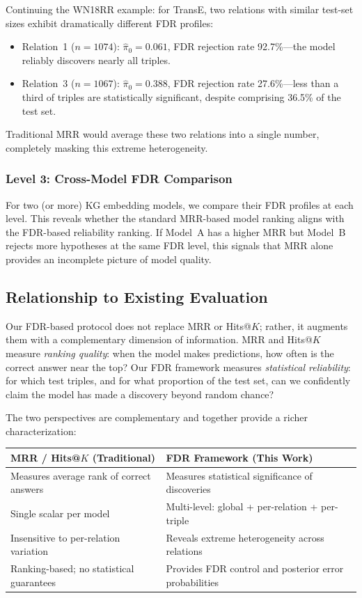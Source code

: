Continuing the WN18RR example: for TransE, two relations with similar test-set sizes exhibit dramatically different FDR profiles:
\begin{itemize}
    \item Relation~1 ($n=1074$): $\hat{\pi}_0 = 0.061$, FDR rejection rate 92.7\%---the model reliably discovers nearly all triples.
    \item Relation~3 ($n=1067$): $\hat{\pi}_0 = 0.388$, FDR rejection rate 27.6\%---less than a third of triples are statistically significant, despite comprising 36.5\% of the test set.
\end{itemize}
Traditional MRR would average these two relations into a single number, completely masking this extreme heterogeneity.

\subsubsection{Level 3: Cross-Model FDR Comparison}
For two (or more) KG embedding models, we compare their FDR profiles at each level.
This reveals whether the standard MRR-based model ranking aligns with the FDR-based reliability ranking.
If Model~A has a higher MRR but Model~B rejects more hypotheses at the same FDR level, this signals that MRR alone provides an incomplete picture of model quality.

\subsection{Relationship to Existing Evaluation}
\label{subsec:relationship}

Our FDR-based protocol does not replace MRR or Hits@$K$; rather, it augments them with a complementary dimension of information.
MRR and Hits@$K$ measure \emph{ranking quality}: when the model makes predictions, how often is the correct answer near the top?
Our FDR framework measures \emph{statistical reliability}: for which test triples, and for what proportion of the test set, can we confidently claim the model has made a discovery beyond random chance?

The two perspectives are complementary and together provide a richer characterization:

\begin{center}
\begin{tabular}{p{} p{}}
\toprule
\textbf{MRR / Hits@$K$ (Traditional)} & \textbf{FDR Framework (This Work)} \\
\midrule
Measures average rank of correct answers & Measures statistical significance of discoveries \\
Single scalar per model & Multi-level: global + per-relation + per-triple \\
Insensitive to per-relation variation & Reveals extreme heterogeneity across relations \\
Ranking-based; no statistical guarantees & Provides FDR control and posterior error probabilities \\
\bottomrule
\end{tabular}
\end{center}

